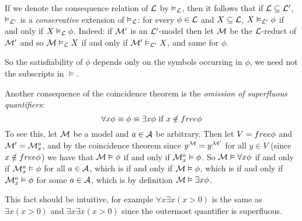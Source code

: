 If we denote the consequence relation of ${\cal L}$ by $\vDash_{\cal L}$, then it follows that if ${\cal L}\subseteq{\cal L}'$, $\vDash_{\cal L'}$ is a {\it conservative} extension of $\vDash_{\cal L}$:
for every $\phi\in{\cal L}$ and $X\subseteq{\cal L}$, $X\vDash_{\cal L'}\phi$ if and only if $X\vDash_{\cal L}\phi$.
Indeed: if ${\cal M}'$ is an ${\cal L'}$-model then let ${\cal M}$ be the ${\cal L}$-reduct of ${\cal M}'$ and so ${\cal M}\vDash_{\cal L} X$ if and only if ${\cal M}'\vDash_{\cal L'}X$, and same for $\phi$.

So the satisfiability of $\phi$ depends only on the symbols occurring in $\phi$, we need not the subscripts in $\vDash$.

Another consequence of the coincidence theorem is the {\it omission of superfluous quantifiers}:
$$ \forall x\phi \equiv \phi \equiv \exists x\phi \hbox{ if $x\notin{\sl free}\phi$} $$
To see this, let ${\cal M}$ be a model and $a\in{\cal A}$ be arbitrary.
Then let $V={\sl free}\phi$ and ${\cal M}'={\cal M}^a_x$, and by the coincidence theorem since $y^{\cal M}=y^{\cal M'}$ for all $y\in V$ (since $x\notin{\sl free}\phi$) we have that ${\cal M}\vDash\phi$ if and
only if ${\cal M}^a_x\vDash\phi$.
So ${\cal M}\vDash\forall x\phi$ if and only if ${\cal M}^a_x\vDash\phi$ for all $a\in{\cal A}$, which is if and only if ${\cal M}\vDash\phi$, which is if and only if ${\cal M}^a_x\vDash\phi$ for some
$a\in{\cal A}$, which is by definition ${\cal M}\vDash\exists x\phi$.

This fact should be intuitive, for example $\forall x\exists x(x>0)$ is the same as $\exists x(x>0)$ and $\exists x\exists x(x>0)$ since the outermost quantifier is superfluous.
